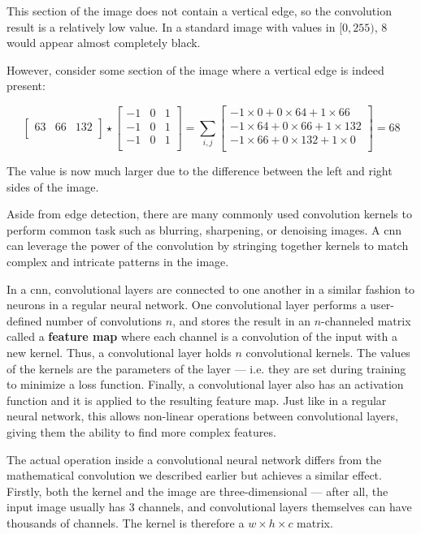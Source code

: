 This section of the image does not contain a vertical edge, so the convolution result is a relatively low value. In a standard image with values in $[0, 255)$, 8 would appear almost completely black.

However, consider some section of the image where a vertical edge is indeed present:

\[
\begin{bmatrix}
63 & 66 & 132\\
\end{bmatrix}
\star
\begin{bmatrix}
-1 & 0 & 1\\
-1 & 0 & 1\\
-1 & 0 & 1\\
\end{bmatrix}
=
\sum_{i,j}
\begin{bmatrix}
-1 \times 0 + 0 \times 64 + 1 \times 66\\ 
-1 \times 64 + 0 \times 66 + 1 \times 132\\
-1 \times 66 + 0 \times 132 + 1 \times 0\\
\end{bmatrix}
= 68
\]

The value is now much larger due to the difference between the left and right sides of the image.

Aside from edge detection, there are many commonly used convolution kernels to perform common task such as blurring, sharpening, or denoising images. A \ac{cnn} can leverage the power of the convolution by stringing together kernels to match complex and intricate patterns in the image.

In a \ac{cnn}, convolutional layers are connected to one another in a similar fashion to neurons in a regular neural network. One convolutional layer performs a user-defined number of convolutions $n$, and stores the result in an $n$-channeled matrix called a \textbf{feature map} where each channel is a convolution of the input with a new kernel. Thus, a convolutional layer holds $n$ convolutional kernels. The values of the kernels are the parameters of the layer --- i.e. they are set during training to minimize a loss function. Finally, a convolutional layer also has an activation function and it is applied to the resulting feature map. Just like in a regular neural network, this allows non-linear operations between convolutional layers, giving them the ability to find more complex features.

The actual operation inside a convolutional neural network differs from the mathematical convolution we described earlier but achieves a similar effect. Firstly, both the kernel and the image are three-dimensional --- after all, the input image usually has 3 channels, and convolutional layers themselves can have thousands of channels. The kernel is therefore a $w \times h \times c$ matrix. 

